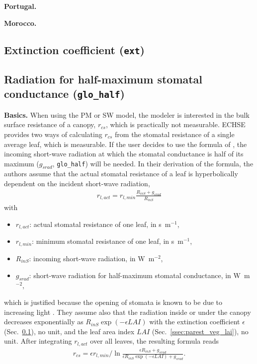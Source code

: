 \documentclass{scrreprt}
\newenvironment{denseitem}{
  \begin{itemize}
    \setlength{\itemsep}{0pt}
    \setlength{\parskip}{0pt}
    \setlength{\parsep}{0pt}
}{
  \end{itemize}
}
\begin{document}
\textbf{Portugal.}

\textbf{Morocco.}

\subsection{Extinction coefficient (\texttt{ext})} \label{ssec:parest_veg_ext}

\subsection{Radiation for half-maximum stomatal conductance (\texttt{glo\_half})} \label{ssec:parest_veg_glohalf}

\textbf{Basics.}
When using the PM or SW model, the modeler is interested in the bulk surface resistance of a canopy, $r_{cs}$, which is practically not measurable.
ECHSE provides two ways of calculating $r_{cs}$ from the stomatal resistance of a single average leaf, which is measurable.
If the user decides to use the formula of \citet{saugier91}, the incoming short-wave radiation at which the stomatal conductance is half of its maximum ($g_{srad}$, \verb!glo_half!) will be needed.
In their derivation of the formula, the authors assume that the actual stomatal resistance of a leaf is hyperbolically dependent on the incident short-wave radiation,
\begin{align} \label{eq:glohalf1}
  r_{l,act} = r_{l,min} \frac{R_{inS} + g_{srad}}{R_{inS}}
\end{align}
%
with
\begin{denseitem}
  \item[] $r_{l,act}$: actual stomatal resistance of one leaf, in s~m$^{-1}$,
  \item[] $r_{l,min}$: minimum stomatal resistance of one leaf, in s~m$^{-1}$,
  \item[] $R_{inS}$: incoming short-wave radiation, in W~m$^{-2}$,
  \item[] $g_{srad}$: short-wave radiation for half-maximum stomatal conductance, in W~m$^{-2}$,
\end{denseitem}
%
which is justified because the opening of stomata is known to be due to increasing light \citep{sonnewald13}.
They assume also that the radiation inside or under the canopy decreases exponentially as $R_{inS} \exp(-\epsilon LAI)$ with the extinction coefficient $\epsilon$ (Sec.~\ref{ssec:parest_veg_ext}), no unit, and the leaf area index $LAI$ (Sec.~\ref{ssec:parest_veg_lai}), no unit.
After integrating $r_{l,act}$ over all leaves, the resulting formula reads
\begin{align} \label{eq:glohalf2}
  r_{cs} = \epsilon r_{l,min} / \ln \frac{\epsilon R_{inS} + g_{srad}}{\epsilon R_{inS} \exp(-\epsilon LAI) + g_{srad}}.
\end{align}
\end{document}
